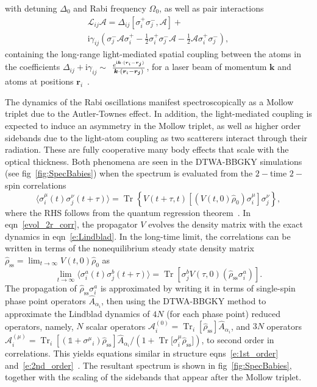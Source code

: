 \documentclass[extendedabs]{bmvc2k}
\newcommand\ii{{\mathrm{i}}}
\DeclareMathOperator{\Tr}{{Tr}}
\newcommand{\Com}[2]{\left[{#1},{#2}\right]}
\begin{document}
with detuning $\Delta_0$ and Rabi frequency $\Omega_0$, as well as 
pair interactions 
\begin{multline}\label{e:Lij}
\mathcal{L}_{ i j}\mathscr{A}=\Delta_{ i j}\Com{\sigma_ i^+\sigma_ j^-}{\mathscr{A}}+\\
\ii\gamma_{ij}\left(\sigma_ j^-\mathscr{A}\sigma_ i^+-\tfrac{1}{2}\sigma_ i^+\sigma_ j^-\mathscr{A}-\tfrac{1}{2}\mathscr{A}\sigma_ i^+\sigma_ j^-\right),
\end{multline}
containing the long-range light-mediated spatial coupling between the atoms in the coefficients $\Delta_{ij}+\ii\gamma_{ij}\sim$
$e^{\ii\bm{k}\cdot(\bm{r}_i-\bm{r_j})}\over{\bm{k}\cdot(\bm{r}_i-\bm{r_j})}$, for a laser beam of momentum $\bm{k}$ and atoms at positions $\bm{r}_i$~\cite{Pucci17}. 

The dynamics of the Rabi oscillations manifest spectroscopically as a Mollow triplet due to the Autler-Townes effect. In addition, the light-mediated coupling is expected to induce an asymmetry in the Mollow triplet, as well as  higher order sidebands due to the light-atom coupling as two scatterers interact through their radiation. These are fully cooperative many body effects that scale with the optical thickness. Both phenomena are seen in the DTWA-BBGKY simulations (see fig~\ref{fig:SpecBabies}) when the spectrum is evaluated from the $2-$time $2-$spin correlations
\begin{equation}\label{evol_2r_corr}
\langle\sigma_ i^\mu(t)\sigma_ j^\nu(t+\tau)\rangle=\Tr\left\{V(t+\tau,t)\left[\left(V(t,0)\hat{\rho}_0\right)\sigma_ i^\mu\right]\sigma_ j^\nu\right\},
\end{equation}
where the RHS follows from the quantum regression theorem~\cite{Pucci17}. In eqn~\ref{evol_2r_corr}, the propagator $V$ evolves the density matrix with the exact dynamics in eqn~\ref{e:Lindblad}. In the long-time limit, the correlations can be written in terms of the nonequilibrium steady state density matrix $\hat{\rho}_\text{ss} = \displaystyle\lim_{t\rightarrow\infty} V(t,0)\hat{\rho}_0$ as
\begin{equation}\label{limcorr}
\lim_{t\to\infty}\langle\sigma_ i^a(t)\sigma_ j^b(t+\tau)\rangle=\Tr\left[\sigma_ j^b V(\tau,0)\left(\hat{\rho}_\text{ss}\sigma_ i^a\right)\right].
\end{equation}
The propagation of $\hat{\rho}_\text{ss}\sigma_ i^a$ is approximated by writing it in terms of single-spin phase point operators $\hat{A}_{\alpha_i}$, then using the DTWA-BBGKY method to approximate the Lindblad dynamics of $4N$ (for each phase point) reduced operators, namely, $N$ scalar operators $\mathscr{A}^{(0)}_i = \Tr_i{[\hat{\rho}_\text{ss}]}\hat{A}_{\alpha_i}$, and $3N$ operators $\mathscr{{A}}^{(\mu)}_i = \Tr_i{[(\mathbb{1}+{\sigma^\mu}_i)\hat{\rho}_\text{ss}]}\hat{A}_{\alpha_i}/(1+\Tr{[{\sigma}^\mu_i\hat{\rho}_\text{ss}}])$, to second order in correlations. This yields equations similar in structure eqns~\ref{e:1st_order} and~\ref{e:2nd_order}~\cite{Pucci17}. The resultant spectrum is shown in fig~\ref{fig:SpecBabies}, together with the scaling of the sidebands that appear after the Mollow triplet.
\end{document}
